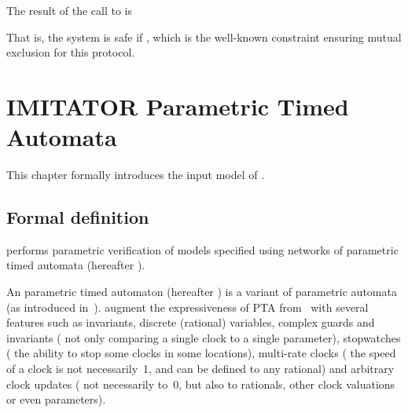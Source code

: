 The result of the call to \imitator{} is


That is, the system is safe if , which is the well-known constraint ensuring mutual exclusion for this protocol.




\chapter{IMITATOR Parametric Timed Automata}\label{section:IPTA}


This chapter formally introduces the input model of \imitator{}.

\section{Formal definition}\label{section:NIPTA}

\imitator{} performs parametric verification of models specified using networks of \imitator{} parametric timed automata (hereafter \NIPTA{}).

An \imitator{} parametric timed automaton (hereafter \IPTA{}) is a variant of parametric automata (as introduced in~\cite{AHV93}).
\IPTA{} augment the expressiveness of PTA from~\cite{AHV93} with several features such as invariants, discrete (rational) variables, complex guards and invariants (\ie{} not only comparing a single clock to a single parameter), stopwatches (\ie{} the ability to stop some clocks in some locations), multi-rate clocks (\ie{} the speed of a clock is not necessarily~1, and can be defined to any rational) and arbitrary clock updates (\ie{} not necessarily to~0, but also to rationals, other clock valuations or even parameters).



